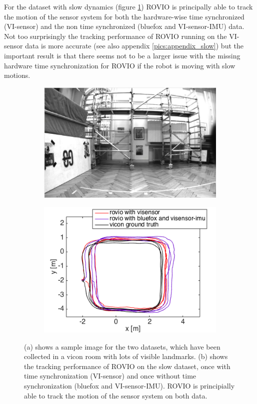 For the dataset with slow dynamics (figure \ref{pics:timesync_slow}) ROVIO is principally able to track the motion of the sensor system for both the hardware-wise time synchronized (VI-sensor) and the non time synchronized (bluefox and VI-sensor-IMU) data. Not too surprisingly the tracking performance of ROVIO running on the VI-sensor data is more accurate (see also appendix \ref{pics:appendix_slow}) but the important result is that there seems not to be a larger issue with the missing hardware time synchronization for ROVIO if the robot is moving with slow motions. \\

\begin{figure}
  \begin{subfigure}[b]{0.46\textwidth}
    \includegraphics[width=\textwidth]{images/slow.png}
    \caption{}
  \end{subfigure}
  \hfill
  \begin{subfigure}[b]{0.42\textwidth}
    \includegraphics[width=\textwidth]{images/slow_2D.png}
    \caption{}
  \end{subfigure}
   \caption{(a) shows a sample image for the two datasets, which have been collected in a vicon room with lots of visible landmarks. (b) shows the tracking performance of ROVIO on the slow dataset, once with time synchronization (VI-sensor) and once without time synchronization (bluefox and VI-sensor-IMU). ROVIO is principially able to track the motion of the sensor system on both data.}
   \label{pics:timesync_slow}
\end{figure}

